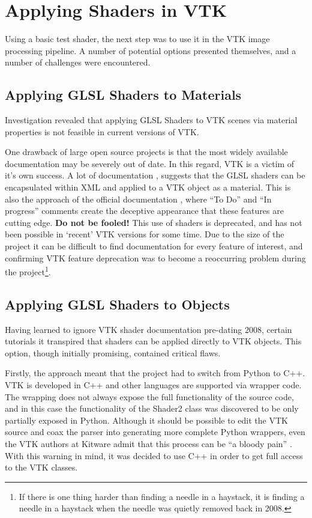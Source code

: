 \documentclass[MSc,paper=a4,pagesize=auto]{icldt}
\begin{document}
\section{Applying Shaders in VTK}

Using a basic test shader, the next step was to use it in the VTK image processing pipeline. A number of potential options presented themselves, and a number of challenges were encountered.

\subsection{Applying GLSL Shaders to Materials}
Investigation revealed that applying GLSL Shaders to VTK scenes via material properties is not feasible in current versions of VTK.

One drawback of large open source projects is that the most widely available documentation may be severely out of date. In this regard, VTK is a victim of it's own success. A lot of documentation \cite{Seip2005}, \cite{OBrien2009} suggests that the GLSL shaders can be encapsulated within XML and applied to a VTK object as a material. This is also the approach of the official documentation \cite{VTK_XML_shaders}, where ``To Do'' and ``In progress'' comments create the deceptive appearance that these features are cutting edge. \textbf{Do not be fooled!} This use of shaders is deprecated, and has not been possible in `recent' VTK versions for some time. Due to the size of the project it can be difficult to find documentation for every feature of interest, and confirming VTK feature deprecation was to become a reoccurring problem during the project\footnote{If there is one thing harder than finding a needle in a haystack, it is finding a needle in a haystack when the needle was quietly removed back in 2008.}.

\subsection{Applying GLSL Shaders to Objects}
Having learned to ignore VTK shader documentation pre-dating 2008, certain tutorials it transpired that shaders can be applied directly to VTK objects. This option, though initially promising, contained critical flaws. 

Firstly, the approach meant that the project had to switch from Python to C++. VTK is developed in C++ and other languages are supported via wrapper code. The wrapping does not always expose the full functionality of the source code, and in this case the functionality of the Shader2 class was discovered to be only partially exposed in Python. Although it should be possible to edit the VTK source and coax the parser into generating more complete Python wrappers, even the VTK authors at Kitware admit that this process can be ``a bloody pain'' \cite{VTK_Wrapper_FAQ}. With this warning in mind, it was decided to use C++ in order to get full access to the VTK classes.
\end{document}
